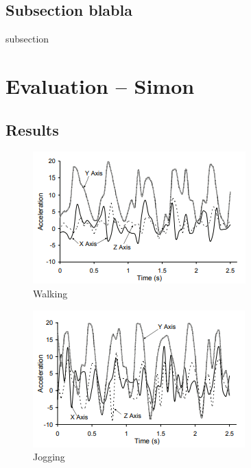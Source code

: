 \documentclass[conference]{IEEEtran}
\begin{document}
\subsection{Subsection blabla}
subsection
\newpage
\section{Evaluation -- Simon}

\subsection{Results}
\begin{figure}[!htb]
  \includegraphics[width=\linewidth]{walking.png}
  \caption{Walking}
  \label{fig:walking}
\end{figure}
\begin{figure}[!htb]
  \includegraphics[width=\linewidth]{jogging.png}
  \caption{Jogging}
  \label{fig:jogging}
\end{figure}
\end{document}
